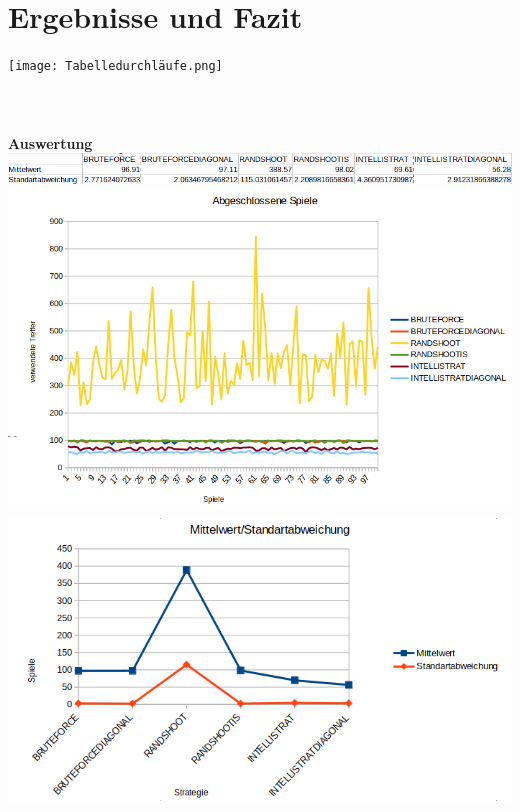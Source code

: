 \section*{Ergebnisse und Fazit}

\texttt{[image: Tabelledurchläufe.png]}\\
\\
\\
\\
\textbf{Auswertung}\\
\includegraphics[scale=0.5]{Auswertung.png}\\
\includegraphics[scale=0.3]{Abgeschlossene Spiele.png}
\includegraphics[scale=0.3]{Screenshot from 2022-02-11 13-19-17.png}



